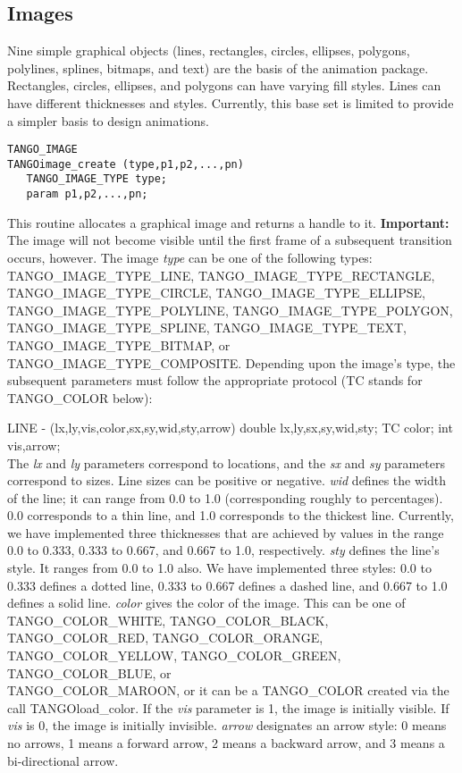 \subsection{Images}
Nine simple graphical objects (lines, rectangles, circles, ellipses,
polygons, polylines, splines, bitmaps,
and text) are the basis of the animation package.  Rectangles, circles,
ellipses, and polygons can have varying fill styles.  Lines can have different
thicknesses and styles.  Currently, this base set is limited to provide a
simpler basis to design animations.

\vspace{1em}
\begin{verbatim}
TANGO_IMAGE
TANGOimage_create (type,p1,p2,...,pn) 
   TANGO_IMAGE_TYPE type;
   param p1,p2,...,pn;
\end{verbatim}
This routine allocates a graphical image and returns a handle to it.
{\bf Important:} The image will not become visible until the first frame of a
subsequent transition occurs, however.  The image {\em type} can be
one of the following types: TANGO\_IMAGE\_TYPE\_LINE,
TANGO\_IMAGE\_TYPE\_RECTANGLE,\\
 TANGO\_IMAGE\_TYPE\_CIRCLE,
TANGO\_IMAGE\_TYPE\_ELLIPSE, TANGO\_IMAGE\_TYPE\_POLYLINE,
TANGO\_IMAGE\_TYPE\_POLYGON, TANGO\_IMAGE\_TYPE\_SPLINE,
TANGO\_IMAGE\_TYPE\_TEXT,\\
TANGO\_IMAGE\_TYPE\_BITMAP, or TANGO\_IMAGE\_TYPE\_COMPOSITE.  Depending
upon the image's type, the subsequent parameters must follow the
appropriate protocol (TC stands for TANGO\_COLOR below):

LINE - (lx,ly,vis,color,sx,sy,wid,sty,arrow) double
lx,ly,sx,sy,wid,sty; TC color; int vis,arrow;\\ 
The {\em lx} and {\em ly}
parameters correspond to locations, and the {\em sx} and {\em sy}
parameters correspond to sizes.  Line sizes can be positive or
negative.  {\em wid} defines the width of the line; it can range from
0.0 to 1.0 (corresponding roughly to percentages).  0.0 corresponds to
a thin line, and 1.0 corresponds to the thickest line.  Currently, we
have implemented three thicknesses that are achieved by values in the
range 0.0 to 0.333, 0.333 to 0.667, and 0.667 to 1.0, respectively.
{\em sty} defines the line's style.  It ranges from 0.0 to 1.0 also.
We have implemented three styles: 0.0 to 0.333 defines a dotted line,
0.333 to 0.667 defines a dashed line, and 0.667 to 1.0 defines a solid
line.  {\em color} gives the color of the image.  This can be one of
TANGO\_COLOR\_WHITE, TANGO\_COLOR\_BLACK, TANGO\_COLOR\_RED,
TANGO\_COLOR\_ORANGE,\\
 TANGO\_COLOR\_YELLOW, TANGO\_COLOR\_GREEN,
TANGO\_COLOR\_BLUE, or\\
 TANGO\_COLOR\_MAROON, or it can be a
TANGO\_COLOR created via the call TANGOload\_color. If the {\em vis}
parameter is 1, the image is initially visible.  If {\em vis} is 0,
the image is initially invisible.  {\em arrow} designates an arrow
style: 0 means no arrows, 1 means a forward arrow, 2 means a backward
arrow, and 3 means a bi-directional arrow.

